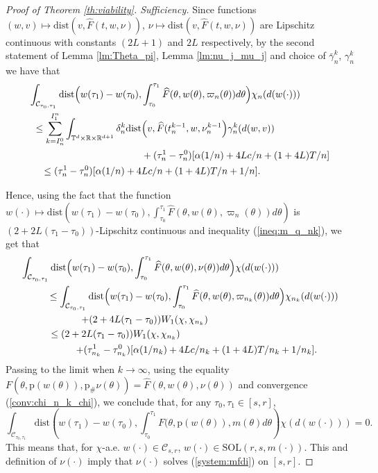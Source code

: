 \documentclass[a4paper,12pt]{article}
\newcommand{\rdp}{\mathbb{R}^{d+1}}
\newcommand{\tdr}{\mathbb{T}^{d}\times\mathbb{R}}
\newcommand{\intc}[2]{\int_{\mathcal{C}_{#1,#2}}}
\begin{document}
\begin{proof}[Proof of Theorem \ref{th:viability}. Sufficiency]
	Since functions $(w,v)\mapsto \mathrm{dist}(v,\widehat{F}(t,w,\nu))$, $\nu\mapsto \mathrm{dist}(v,\widehat{F}(t,w,\nu))$ are Lipschitz continuous with constants $(2L+1)$ and $2L$ respectively, by the second statement of Lemma \ref{lm:Theta_pi},  Lemma \ref{lm:nu_j_mu_j} and choice of $\bar{\gamma}_n^k$, ${\gamma}_n^k$ we have that
	\begin{equation*}
	\begin{split}
	\intc{\tau_0}{\tau_1}\mathrm{dist}\Bigl(w(\tau_1)-w(\tau_0), &\int_{\tau_0}^{\tau_1}\widehat{F}(\theta,w(\theta),\varpi_n(\theta))d\theta \Bigr)\chi_n(d(w(\cdot)))\\ \leq
	\sum_{k=I_n^0}^{I_1^n}\int_{\tdr\times\rdp} \delta_n^{k}\mathrm{dist}&\Bigl(v, \widehat{F}(t_n^{k-1},w,\nu_n^{k-1}\Bigr){\gamma}_n^k(d(w,v))
	\\&+(\tau_n^1-\tau_n^0)[\alpha(1/n)+4Lc/n+(1+4L)T/n]\\ \leq (\tau_n^1-\tau_n^0)[\alpha(1/n)+4&Lc/n+(1+4L)T/n+1/n].
	\end{split}
	\end{equation*}
	
	Hence, using the fact that the function $w(\cdot)\mapsto \mathrm{dist}(w(\tau_1)-w(\tau_0), \int_{\tau_0}^{\tau_1}\widehat{F}(\theta,w(\theta),\varpi_n(\theta))d\theta)$ is $(2+2L(\tau_1-\tau_0))$-Lipschitz continuous and inequality (\ref{ineq:m_q_nk}), we get that
	\begin{equation*}
	\begin{split}
	\intc{\tau_0}{\tau_1}\mathrm{dist}\Bigl(w(\tau_1)-w(\tau_0), &\int_{\tau_0}^{\tau_1}\widehat{F}(\theta,w(\theta),\nu(\theta))d\theta \Bigr)\chi(d(w(\cdot)))\\ 
	\leq
	\intc{\tau_0}{\tau_1}\mathrm{dist}\Bigl(w(\tau_1)&-w(\tau_0), \int_{\tau_0}^{\tau_1}\widehat{F}(\theta,w(\theta),\varpi_{n_k}(\theta))d\theta \Bigr)\chi_{n_k}(d(w(\cdot)))\\+(2+4L(\tau_1&-\tau_0))W_1(\chi,\chi_{n_k})\\ \leq (2+2L(\tau_1-\tau_0))&W_1(\chi,\chi_{n_k})\\
	+(\tau_{n_k}^1-\tau_{n_k}^0)[&\alpha(1/n_k)+4Lc/n_k+(1+4L)T/n_k+1/n_k].
	\end{split}
	\end{equation*}
	Passing to the limit when $k\rightarrow\infty$, using the equality $F(\theta,\mathrm{p}(w(\theta)),\mathrm{p}_\#\nu(\theta))=\widehat{F}(\theta,w(\theta),\nu(\theta))$ and convergence (\ref{conv:chi_n_k_chi}), we conclude that, for any $\tau_0,\tau_1\in [s,r]$,
	$$\intc{\tau_0}{\tau_1}\mathrm{dist}\left(w(\tau_1)-w(\tau_0), \int_{\tau_0}^{\tau_1}F(\theta,\mathrm{p}(w(\theta)),m(\theta)d\theta \right)\chi(d(w(\cdot)))=0. $$ This means that, for $\chi$-a.e. $w(\cdot)\in\mathcal{C}_{s,r}$,
	$w(\cdot)\in \mathrm{SOL}(r,s,m(\cdot))$. This and definition of $\nu(\cdot)$ imply that
	$\nu(\cdot)$ solves (\ref{system:mfdi}) on $[s,r]$.
	

\end{proof}
\end{document}
